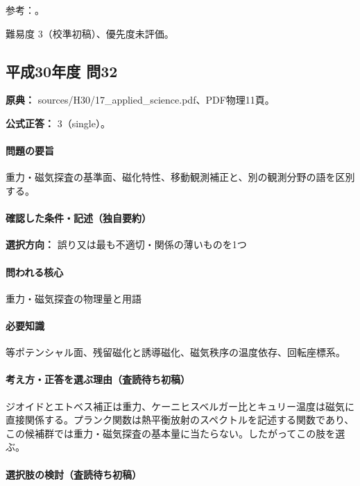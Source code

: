 \par 参考：\cite{gsi_gravity_definitions}。

\par 難易度 3（校準初稿）、優先度未評価。

\subsection{平成30年度 問32}
\label{q:h30-reg-applied-32}

\noindent\textbf{原典：} sources/H30/17\_applied\_science.pdf、PDF物理11頁。

\textbf{公式正答：} 3（single）。

\paragraph{問題の要旨} 重力・磁気探査の基準面、磁化特性、移動観測補正と、別の観測分野の語を区別する。

\paragraph{確認した条件・記述（独自要約）}\mbox{}\par

\noindent\textbf{選択方向：} 誤り又は最も不適切・関係の薄いものを1つ\par

\paragraph{問われる核心} 重力・磁気探査の物理量と用語

\paragraph{必要知識} 等ポテンシャル面、残留磁化と誘導磁化、磁気秩序の温度依存、回転座標系。

\paragraph{考え方・正答を選ぶ理由（査読待ち初稿）} ジオイドとエトベス補正は重力、ケーニヒスベルガー比とキュリー温度は磁気に直接関係する。プランク関数は熱平衡放射のスペクトルを記述する関数であり、この候補群では重力・磁気探査の基本量に当たらない。したがってこの肢を選ぶ。

\paragraph{選択肢の検討（査読待ち初稿）}\mbox{}\par

